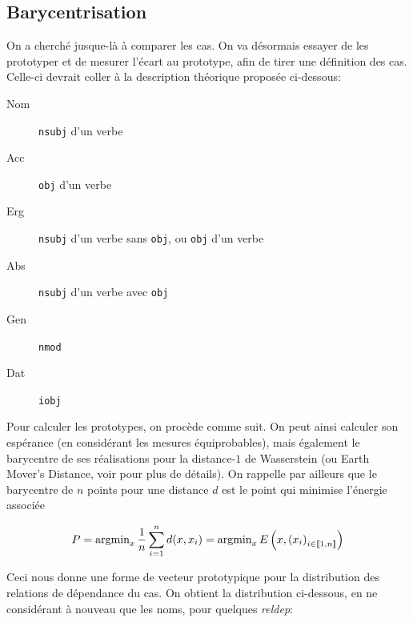 \documentclass{cours}
\begin{document}
\subsection{Barycentrisation}
On a cherché jusque-là à comparer les cas.
On va désormais essayer de les prototyper et de mesurer l'écart au prototype, afin de tirer une définition des cas.
Celle-ci devrait coller à la description théorique proposée ci-dessous:

\begin{multicols}{2}
	\begin{description}
		\item[Nom] \texttt{nsubj} d'un verbe
		\item[Acc] \texttt{obj} d'un verbe
		\item[Erg] \texttt{nsubj} d'un verbe sans \texttt{obj}, ou \texttt{obj} d'un verbe
		\item[Abs] \texttt{nsubj} d'un verbe avec \texttt{obj}
		\item[Gen] \texttt{nmod}
		\item[Dat] \texttt{iobj}
	\end{description}
\end{multicols}
Pour calculer les prototypes, on procède comme suit.
On peut ainsi calculer son espérance (en considérant les mesures équiprobables), mais également le barycentre de ses réalisations pour la distance-$1$ de Wasserstein (ou Earth Mover's Distance, voir \cite{PythonPOT} pour plus de détails).
On rappelle par ailleurs que le barycentre de $n$ points pour une distance $d$ est le point qui minimise l'énergie associée

\begin{equation*}
	P = \operatorname{argmin}_{x} \frac{1}{n}\sum_{i = 1}^{n} d(x, x_{i}) = \operatorname{argmin}_{x} E\left(x, \left(x_{i}\right)_{i \in \left\llbracket 1, n\right\rrbracket}\right)
\end{equation*}

Ceci nous donne une forme de vecteur prototypique pour la distribution des relations de dépendance du cas.
On obtient la distribution ci-dessous, en ne considérant à nouveau que les noms, pour quelques \textit{reldep}:
\end{document}
